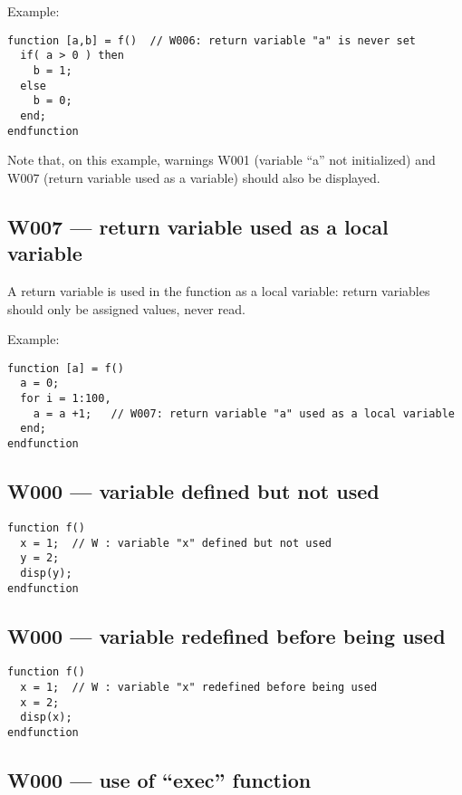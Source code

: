 Example:\begin{verbatim}
function [a,b] = f()  // W006: return variable "a" is never set
  if( a > 0 ) then
    b = 1;
  else
    b = 0;
  end;
endfunction
\end{verbatim}
Note that, on this example, warnings W001 (variable ``a'' not initialized)
and W007 (return variable used as a variable) should also be displayed.



\subsection{W007 --- return variable used as a local variable}




A return variable is used in the function as a local variable: return
variables should only be assigned values, never read.



Example:\begin{verbatim}
function [a] = f()
  a = 0;
  for i = 1:100,
    a = a +1;   // W007: return variable "a" used as a local variable
  end;
endfunction
\end{verbatim}




\subsection{W000 --- variable defined but not used}


\begin{verbatim}
function f()
  x = 1;  // W : variable "x" defined but not used
  y = 2;
  disp(y);
endfunction
\end{verbatim}


\subsection{W000 --- variable redefined before being used}


\begin{verbatim}
function f()
  x = 1;  // W : variable "x" redefined before being used
  x = 2;
  disp(x);
endfunction
\end{verbatim}


\subsection{W000 --- use of ``exec'' function     }




